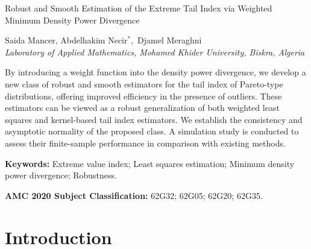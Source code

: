 \documentclass[12pt,reqno,openbib,runningheads,a4paper,portrait]{amsart}%
\begin{document}
\begin{center}
{\Large Robust and Smooth Estimation of the Extreme Tail Index via Weighted
Minimum Density Power Divergence}\bigskip

{\large Saida Mancer, Abdelhakim Necir}$^{\ast},$ {\large Djamel
Meraghni}\medskip\\[0pt]

{\small \textit{Laboratory of Applied Mathematics, Mohamed Khider University,
Biskra, Algeria}}\medskip\medskip
\end{center}

\noindent By introducing a weight function into the density power divergence,
we develop a new class of robust and smooth estimators for the tail index of
Pareto-type distributions, offering improved efficiency in the presence of
outliers. These estimators can be viewed as a robust generalization of both
weighted least squares and kernel-based tail index estimators. We establish
the consistency and asymptotic normality of the proposed class. A simulation
study is conducted to assess their finite-sample performance in comparison
with existing methods. \medskip\medskip

\noindent\textbf{Keywords:} Extreme value index; Least squares estimation;
Minimum density power divergence; Robustness. \medskip

\noindent\textbf{AMC 2020 Subject Classification:} 62G32; 62G05; 62G20; 62G35.

\vfill


\vfill



\section{\textbf{Introduction\label{sec1}}}
\end{document}
